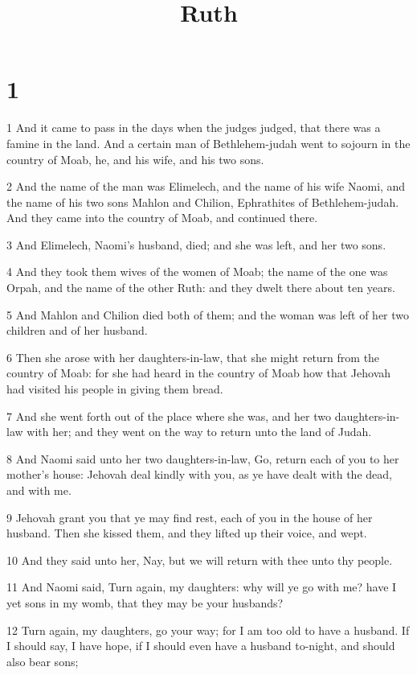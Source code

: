 

\title{Ruth}

\chapter{1}

\par 1 And it came to pass in the days when the judges judged, that there was a famine in the land. And a certain man of Bethlehem-judah went to sojourn in the country of Moab, he, and his wife, and his two sons.
\par 2 And the name of the man was Elimelech, and the name of his wife Naomi, and the name of his two sons Mahlon and Chilion, Ephrathites of Bethlehem-judah. And they came into the country of Moab, and continued there.
\par 3 And Elimelech, Naomi's husband, died; and she was left, and her two sons.
\par 4 And they took them wives of the women of Moab; the name of the one was Orpah, and the name of the other Ruth: and they dwelt there about ten years.
\par 5 And Mahlon and Chilion died both of them; and the woman was left of her two children and of her husband.
\par 6 Then she arose with her daughters-in-law, that she might return from the country of Moab: for she had heard in the country of Moab how that Jehovah had visited his people in giving them bread.
\par 7 And she went forth out of the place where she was, and her two daughters-in-law with her; and they went on the way to return unto the land of Judah.
\par 8 And Naomi said unto her two daughters-in-law, Go, return each of you to her mother's house: Jehovah deal kindly with you, as ye have dealt with the dead, and with me.
\par 9 Jehovah grant you that ye may find rest, each of you in the house of her husband. Then she kissed them, and they lifted up their voice, and wept.
\par 10 And they said unto her, Nay, but we will return with thee unto thy people.
\par 11 And Naomi said, Turn again, my daughters: why will ye go with me? have I yet sons in my womb, that they may be your husbands?
\par 12 Turn again, my daughters, go your way; for I am too old to have a husband. If I should say, I have hope, if I should even have a husband to-night, and should also bear sons;
